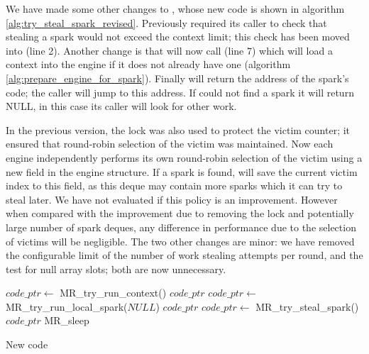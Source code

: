 We have made some other changes to \trystealspark,
whose new code is shown in algorithm \ref{alg:try_steal_spark_revised}.
Previously \trystealspark required its caller to check that stealing a spark
would not exceed the context limit;
this check has been moved into \trystealspark (line 2).
Another change is that \trystealspark
will now call \prepareengineforspark (line 7)
which will load a context into the engine if it does not already have one
(algorithm \ref{alg:prepare_engine_for_spark}).
Finally \trystealspark will return the address of the spark's code;
the caller will jump to this address.
If \trystealspark could not find a spark it will return NULL,
in this case its caller will look for other work.

In the previous version,
the lock was also used to protect the victim counter;
it ensured that round-robin selection of the victim was maintained.
Now each engine independently performs its own round-robin selection of the
victim using a new field  in the engine structure.
If a spark is found, \trystealspark will save the current victim index to
this field, as this deque may contain more sparks which it can try to
steal later.
We have not evaluated if this policy is an improvement.
However when compared with the improvement due to removing the lock and
potentially large number of spark deques,
any difference in performance due to the selection of victims will be
negligible.
The two other changes are minor:
we have removed the configurable limit of the number of work stealing
attempts per round,
and the test for null array slots;
both are now unnecessary.

\begin{algorithm}[tbp]
\begin{algorithmic}
        \State $code\_ptr \gets$ MR\_try\_run\_context()
            \Goto $code\_ptr$
        \EndIf
        \State $code\_ptr \gets$ MR\_try\_run\_local\_spark($NULL$)
            \Goto $code\_ptr$
        \EndIf
        \State $code\_ptr \gets$ MR\_try\_steal\_spark()
            \Goto $code\_ptr$
        \EndIf
        \Goto MR\_sleep
    \EndProcedure
\end{algorithmic}
\caption{New \idle code}
\label{alg:idle_entry_point}
\end{algorithm}

